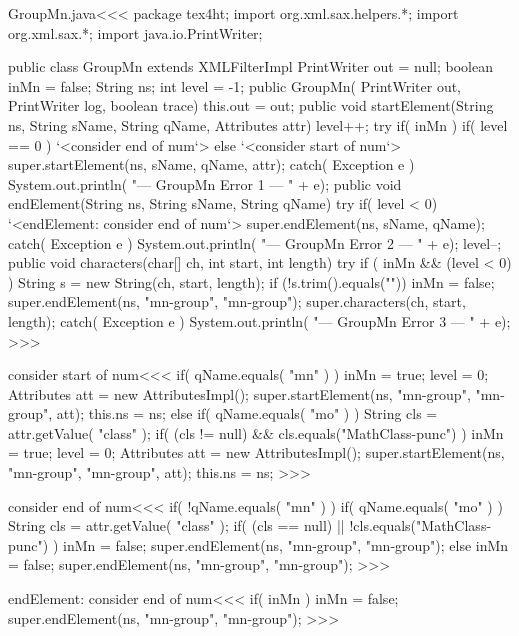 \documentclass{article}
\begin{document}
\<GroupMn.java\><<< 
package tex4ht;
import org.xml.sax.helpers.*; 
import org.xml.sax.*; 
import java.io.PrintWriter; 
 
public class GroupMn extends XMLFilterImpl { 
     PrintWriter out = null; 
     boolean inMn = false;
     String ns;
     int level = -1;
   public GroupMn( PrintWriter out, PrintWriter log, boolean trace){ 
     this.out = out; 
   } 
   public void startElement(String ns, String sName, 
                           String qName, Attributes attr) { 
      level++;
      try{ 
        if( inMn ){ 
           if( level == 0 ){ `<consider end of num`> }
        } else { `<consider start of num`> } 
        super.startElement(ns, sName, qName, attr); 
      } catch( Exception e ){
        System.out.println( "--- GroupMn Error 1 --- " + e);
      } 
   }   
   public void endElement(String ns, String sName, String qName){ 
      try{ 
        if( level < 0) { 
          `<endElement: consider end of num`>
        }
        super.endElement(ns, sName, qName); 
      } catch( Exception e ){
        System.out.println( "--- GroupMn Error 2 --- " + e);
      } 
      level--;
   }   
   public void characters(char[] ch, int start, int length){ 
      try{ 
        if ( inMn  && (level < 0) ) {
           String s = new String(ch, start, length);
           if (!s.trim().equals("")) {
             inMn = false;
             super.endElement(ns, "mn-group", "mn-group");
        }  }
        super.characters(ch, start, length); 
      } catch( Exception e ){
        System.out.println( "--- GroupMn Error 3 --- " + e);
}  }  } 
>>> 

\<consider start of num\><<<
if( qName.equals( "mn" ) ){
   inMn = true; level = 0;
   Attributes att = new AttributesImpl();
   super.startElement(ns, "mn-group", "mn-group", att); 
   this.ns = ns;
} else if( qName.equals( "mo" ) ){
   String cls = attr.getValue( "class" );
   if( (cls != null) && cls.equals("MathClass-punc") ){
      inMn = true; level = 0;
      Attributes att = new AttributesImpl();
      super.startElement(ns, "mn-group", "mn-group", att); 
      this.ns = ns;
}  }
>>>

\<consider end of num\><<<
if( !qName.equals( "mn" ) ){
  if( qName.equals( "mo" ) ){
     String cls = attr.getValue( "class" );
     if( (cls == null) || !cls.equals("MathClass-punc") ){
        inMn = false;  
        super.endElement(ns, "mn-group", "mn-group"); 
     }
  } else {
     inMn = false;
     super.endElement(ns, "mn-group", "mn-group"); 
} }
>>>

\<endElement: consider end of num\><<<
if( inMn ){
   inMn = false;
   super.endElement(ns, "mn-group", "mn-group"); 
}
>>>
\end{document}
